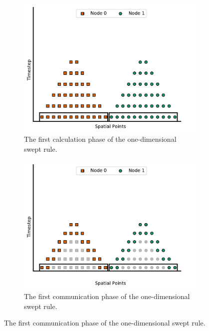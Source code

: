 \documentclass[mca,article,submit,moreauthors,pdftex]{Definitions/mdpi}
\begin{document}
\begin{figure}[htbp]
    \widefigure
    \hfill
    \begin{subfigure}[b]{0.5\textwidth}
        \widefigure
        \includegraphics[scale=0.5]{figs/a_UpTriangle.pdf}
        \caption{The first calculation phase of the one-dimensional swept rule.}
        \label{fig:UpTriangle}
    \end{subfigure}
    \hfill
    \begin{subfigure}[b]{0.45\textwidth}
        \widefigure
        \includegraphics[scale=0.5]{figs/b_Comm1.pdf}
        \caption{The first communication phase of the one-dimensional swept rule.}
        \label{fig:1d-comm-1}
    \end{subfigure}

\end{figure}
\end{document}

